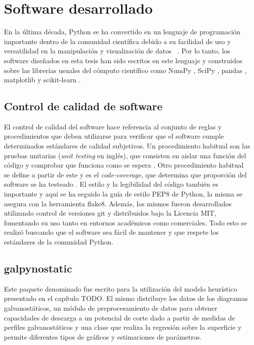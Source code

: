 \chapter{Software desarrollado}

En la última década, Python se ha convertido en un lenguaje de programación 
importante dentro de la comunidad científica debido a su facilidad de uso y 
versatilidad en la manipulación y visualización de datos ~\cite{millman2011}. 
Por lo tanto, los software diseñados en esta tesis han sido escritos en este
lenguaje y construidos sobre las librerías usuales del cómputo científico como
NumPy \cite{numpy}, SciPy \cite{scipy}, pandas \cite{pandas}, 
matplotlib \cite{matplotlib} y scikit-learn \cite{sklearn1, sklearn2}. 


\section{Control de calidad de software}

El control de calidad del software hace referencia al conjunto de reglas y 
procedimientos que deben utilizarse para verificar que el software cumple 
determinados estándares de calidad subjetivos. Un procedimiento habitual son las 
pruebas unitarias (\textit{unit testing} en inglés), que consisten en aislar una 
función del código y comprobar que funciona como se espera \cite{jazayeri2007}. 
Otro procedimiento habitual se define a partir de este y es el 
\textit{code-coverage}, que determina que proporción del software se ha testeado
\cite{miller1963}. El estilo y la legibilidad del código también es importante
y aquí se ha seguido la guía de estilo PEP8 de Python, la misma se asegura con 
la herramienta flake8. Además, los mismos fueron desarrollados utilizando control 
de versiones git y distribuidos bajo la Licencia MIT, fomentando su uso tanto en 
entornos académicos como comerciales. Todo esto se realizó buscando que el 
software sea fácil de mantener y que respete los estándares de la comunidad Python.


\section{galpynostatic}

Este paquete denominado  fue escrito para la utilización
del modelo heurístico presentado en el capítulo TODO. El mismo distribuye los 
datos de los diagramas galvanostáticos, un módulo de preprocesamiento de datos
para obtener capacidades de descarga a un potencial de corte dado a partir de 
medidas de perfiles galvanostáticos y una clase que realiza la regresión sobre la 
superficie y permite diferentes tipos de gráficos y estimaciones de parámetros.

